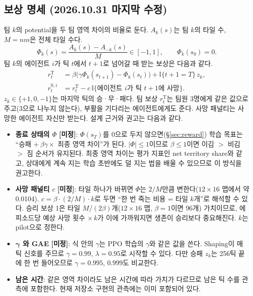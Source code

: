 \documentclass[11pt,a4paper]{article}
\newcommand{\ind}{\mathbb{I}}
\newcommand{\TBD}{\textbf{[미정]}}
\begin{document}
\subsection{보상 명세 (2026.10.31 마지막 수정)}\label{sec:reward-spec}
팀 \(k\)의 potential을 두 팀 영역 차이의 비율로 둔다. \(A_k(s)\)는 팀 \(k\)의 타일 수, \(M=nm\)은 전체 타일 수다.
\begin{equation}
 \Phi_k(s)=\frac{A_k(s)-A_{-k}(s)}{M}\in[-1,1],\qquad \Phi_k(s_0)=0.
\end{equation}
팀 \(k\)의 에이전트 \(i\)가 틱 \(t\)에서 \(t+1\)로 넘어갈 때 받는 보상은 다음과 같다.
\begin{align}
 r^{\mathrm{T}}_t&=\beta\bigl(\gamma\Phi_k(s_{t+1})-\Phi_k(s_t)\bigr)+\ind\{t+1=T\}\,z_k,\\
 r^{\mathrm{S},i}_t&=r^{\mathrm{T}}_t-c\,\ind\{\text{에이전트 }i\text{가 틱 }t+1\text{에 사망}\}.
\end{align}
\(z_k\in\{+1,0,-1\}\)는 마지막 틱의 승·무·패다. 팀 보상 \(r^{\mathrm T}_t\)는 팀원 3명에게 같은 값으로 주고(3으로 나누지 않는다), 부활을 기다리는 에이전트에게도 준다. 사망 패널티는 사망한 에이전트 자신만 받는다. 설계 근거와 권고는 다음과 같다.
\begin{itemize}
 \item \textbf{종료 상태의 \(\Phi\)} \TBD: \(\Phi(s_T)\)를 0으로 두지 않으면(\S\ref{sec:reward}) 학습 목표는 ``승패 \(+\ \beta\gamma\times\) 최종 영역 차이''가 된다. \(|\Phi|\le1\)이므로 \(\beta\le1\)이면 이김 \(>\) 비김 \(>\) 짐 순서가 유지된다. 최종 영역 차이는 평가 지표인 net territory share와 같고, 상대에게 계속 지는 학습 초반에도 덜 지는 법을 배울 수 있으므로 이 방식을 권고한다.
 \item \textbf{사망 패널티 \(c\)} \TBD: 타일 하나가 바뀌면 \(\Phi\)는 \(2/M\)만큼 변한다(\(12\times16\) 맵에서 약 0.0104). \(c=\beta\cdot(2/M)\cdot k\)로 두면 ``한 번 죽는 비용 = 타일 \(k\)개''로 해석할 수 있다. 승리 보상 1은 타일 \(M/(2\beta)\)개(\(12\times16\) 맵, \(\beta=1\)이면 96개) 가치이므로, 에피소드당 예상 사망 횟수 \(\times\,k\)가 이에 가까워지면 생존이 승리보다 중요해진다. \(k\)는 pilot으로 정한다.
 \item \textbf{$\bm{\gamma}$ 와 GAE} \TBD: 식 안의 \(\gamma\)는 PPO 학습의 \(\gamma\)와 같은 값을 쓴다. Shaping이 매 틱 신호를 주므로 \(\gamma=0.99\), \(\lambda=0.95\)로 시작할 수 있다. 다만 승패 \(z_k\)는 256틱 끝에 한 번 들어오므로 \(\gamma=0.995\), \(0.999\)도 비교한다.
 \item \textbf{남은 시간}: 같은 영역 차이라도 남은 시간에 따라 가치가 다르므로 남은 틱 수를 관측에 포함한다. 현재 저장소 구현의 관측에는 이미 포함되어 있다.
\end{itemize}
\end{document}
